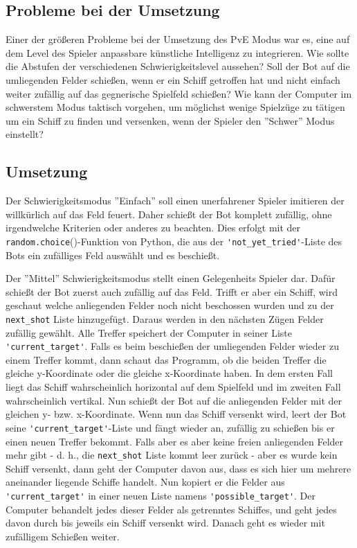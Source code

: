 \documentclass{article}
\begin{document}
\subsection{Probleme bei der Umsetzung}
    Einer der größeren Probleme bei der Umsetzung des PvE Modus war es, eine auf dem Level des Spieler anpassbare künstliche Intelligenz zu integrieren. Wie sollte die Abstufen der verschiedenen Schwierigkeitslevel aussehen? Soll der Bot auf die umliegenden Felder schießen, wenn er ein Schiff getroffen hat und nicht einfach weiter zufällig auf das gegnerische Spielfeld schießen? Wie kann der Computer im schwerstem Modus taktisch vorgehen, um möglichst wenige Spielzüge zu tätigen um ein Schiff zu finden und versenken, wenn der Spieler den ''Schwer'' Modus einstellt?

\subsection{Umsetzung}
    Der Schwierigkeitsmodus ''Einfach'' soll einen unerfahrener Spieler imitieren der willkürlich auf das Feld feuert. Daher schießt der Bot komplett zufällig, ohne irgendwelche Kriterien oder anderes zu beachten. Dies erfolgt mit der \verb$random.choice$()-Funktion von Python, die aus der \verb$'not_yet_tried'$-Liste des Bots ein zufälliges Feld auswählt und es beschießt.\\

\par
    Der ''Mittel'' Schwierigkeitsmodus stellt einen Gelegenheits Spieler dar. Dafür schießt der Bot zuerst auch zufällig auf das Feld. Trifft er aber ein Schiff, wird geschaut welche anliegenden Felder noch nicht beschossen wurden und zu der \verb$next_shot$ Liste hinzugefügt. Daraus werden in den nächsten Zügen Felder zufällig gewählt. Alle Treffer speichert der Computer in seiner Liste \verb$'current_target'$. Falls es beim beschießen der umliegenden Felder wieder zu einem Treffer kommt, dann schaut das Programm, ob die beiden Treffer die gleiche y-Koordinate oder die gleiche x-Koordinate haben. In dem ersten Fall liegt das Schiff wahrscheinlich horizontal auf dem Spielfeld und im zweiten Fall wahrscheinlich vertikal. Nun schießt der Bot auf die anliegenden Felder mit der gleichen y- bzw. x-Koordinate. Wenn nun das Schiff versenkt wird, leert der Bot seine \verb$'current_target'$-Liste und fängt wieder an, zufällig zu schießen bis er einen neuen Treffer bekommt. Falls aber es aber keine freien anliegenden Felder mehr gibt - d. h., die \verb$next_shot$ Liste kommt leer zurück - aber es wurde kein Schiff versenkt, dann geht der Computer davon aus, dass es sich hier um mehrere aneinander liegende Schiffe handelt. Nun kopiert er die Felder aus \verb$'current_target'$ in einer neuen Liste namens \verb$'possible_target'$. Der Computer behandelt jedes dieser Felder als getrenntes Schiffes, und geht jedes davon durch bis jeweils ein Schiff versenkt wird. Danach geht es wieder mit zufälligem Schießen weiter.\\
\end{document}
